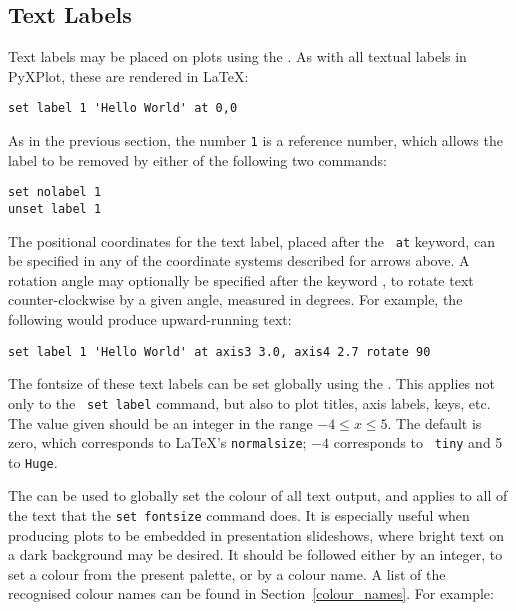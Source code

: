 \subsection{Text Labels}

Text labels may be placed on plots using the . As with all
textual labels in PyXPlot, these are rendered in \LaTeX:

\begin{verbatim}
set label 1 'Hello World' at 0,0
\end{verbatim}

As in the previous section, the number {\tt 1} is a reference number, which
allows the label to be removed by either of the following two commands:

\begin{verbatim}
set nolabel 1
unset label 1
\end{verbatim}

\noindent The positional coordinates for the text label, placed after the {\tt
at} keyword, can be specified in any of the coordinate systems described for
arrows above. A rotation angle may optionally be specified after the keyword
, to rotate text counter-clockwise by a given angle, measured
in degrees. For example, the following would produce upward-running text:

\begin{verbatim}
set label 1 'Hello World' at axis3 3.0, axis4 2.7 rotate 90
\end{verbatim}

 The fontsize of these text labels can be set
globally using the . This applies not only to the {\tt
set label} command, but also to plot titles, axis labels, keys, etc. The value
given should be an integer in the range $-4 \leq x \leq 5$. The default is
zero, which corresponds to \LaTeX's {\tt normalsize}; $-4$ corresponds to {\tt
tiny} and 5 to {\tt Huge}.

 The  can be
used to globally set the colour of all text output, and applies to all of the
text that the {\tt set fontsize} command does. It is especially useful when
producing plots to be embedded in presentation slideshows, where bright text on
a dark background may be desired. It should be followed either by an integer,
to set a colour from the present palette, or by a colour name. A list of the
recognised colour names can be found in Section~\ref{colour_names}.  For
example:

